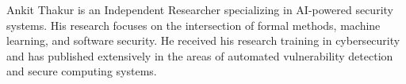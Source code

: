 \documentclass[10pt,journal,compsoc]{IEEEtran}
\begin{document}
\begin{IEEEbiography}{Ankit Thakur}
is an Independent Researcher specializing in AI-powered security systems. His research focuses on the intersection of formal methods, machine learning, and software security. He received his research training in cybersecurity and has published extensively in the areas of automated vulnerability detection and secure computing systems.
\end{IEEEbiography}

\vfill
\end{document}
